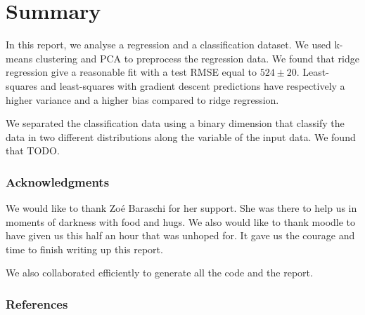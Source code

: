 \documentclass{article} %
\begin{document}
\section{Summary}
In this report, we analyse a regression and a classification dataset. We used k-means clustering and PCA to preprocess the regression data. We found that ridge regression give a reasonable fit with a test RMSE equal to $524 \pm 20$. Least-squares and least-squares with gradient descent predictions have respectively a higher variance and a higher bias compared to ridge regression.

We separated the classification data using a binary dimension that classify the data in two different distributions along the variable of the input data. We found that TODO.


\subsubsection*{Acknowledgments}
We would like to thank Zo\'e Baraschi for her support. She was there to help us in moments of darkness with food and hugs. We also would like to thank moodle to have given us this half an hour that was unhoped for. It gave us the courage and time to finish writing up this report.

We also collaborated efficiently to generate all the code and the report.

\subsubsection*{References}
\end{document}
